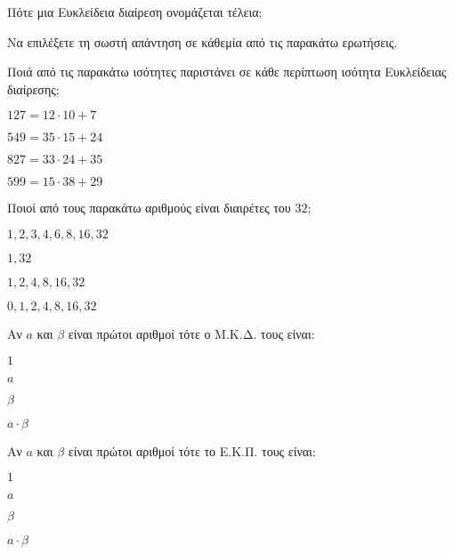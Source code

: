 \documentclass[ektypwsh]{diag-xelatex}
\begin{document}
\begin{thema}
\begin{erwthma}
\begin{rlist}
\item Πότε μια Ευκλείδεια διαίρεση ονομάζεται τέλεια;
\end{rlist}
\item Να επιλέξετε τη σωστή απάντηση σε κάθεμία από τις παρακάτω ερωτήσεις.
\begin{rlist}[leftmargin=4mm]
\item Ποιά από τις παρακάτω ισότητες παριστάνει σε κάθε περίπτωση ισότητα Ευκλείδειας διαίρεσης;
\begin{multicols}{4}
\begin{alist}
\item $ 127=12\cdot 10+7 $
\item $ 549=35\cdot 15+24 $
\item $ 827=33\cdot24+35 $
\item $ 599=15\cdot 38+29 $
\end{alist}
\end{multicols}
\item Ποιοί από τους παρακάτω αριθμούς είναι διαιρέτες του $ 32 $;
\begin{multicols}{4}
\begin{alist}
\item $ 1,2,3,4,6,8,16,32 $
\item $ 1,32 $
\item $ 1,2,4,8,16,32 $
\item $ 0,1,2,4,8,16,32 $
\end{alist}
\end{multicols}
\item Αν $ a $ και $ \beta $ είναι πρώτοι αριθμοί τότε ο Μ.Κ.Δ. τους είναι:
\begin{multicols}{4}
\begin{alist}
\item $ 1 $
\item $ a $
\item $ \beta $
\item $ a\cdot\beta $
\end{alist}
\end{multicols}
\item Αν $ a $ και $ \beta $ είναι πρώτοι αριθμοί τότε το Ε.Κ.Π. τους είναι:
\begin{multicols}{4}
\begin{alist}
\item $ 1 $
\item $ a $
\item $ \beta $
\item $ a\cdot\beta $
\end{alist}
\end{multicols}
\end{rlist}
\end{erwthma}
\end{thema}
\end{document}
